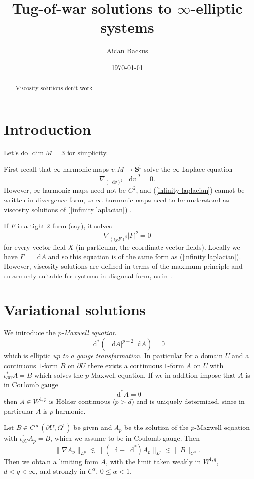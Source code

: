 \documentclass[reqno,11pt]{amsart}
\title{Tug-of-war solutions to $\infty$-elliptic systems}
\author{Aidan Backus}
\date{\today}
\newcommand{\Sph}{\mathbf S}
\newcommand*\dif{\mathop{}\!\mathrm{d}}
\newcommand{\dfn}[1]{\emph{#1}\index{#1}}
\theoremstyle{definition}
\numberwithin{equation}{section}
\begin{document}
\begin{abstract}
Viscosity solutions don't work
\end{abstract}

\maketitle

\section{Introduction}
Let's do $\dim M = 3$ for simplicity.

First recall that $\infty$-harmonic maps $v: M \to \Sph^1$ solve the $\infty$-Laplace equation 
\begin{equation}\label{infinity laplacian}
\nabla_{(\dif v)^\sharp} |\dif v|^2 = 0.
\end{equation}
However, $\infty$-harmonic maps need not be $C^2$, and (\ref{infinity laplacian}) cannot be written in divergence form, so $\infty$-harmonic maps need to be understood as viscosity solutions of (\ref{infinity laplacian}) \cite{Crandall2008}.

If $F$ is a tight $2$-form (say), it solves 
$$\nabla_{(\iota_X F)^\sharp} |F|^2 = 0$$
for every vector field $X$ (in particular, the coordinate vector fields).
Locally we have $F = \dif A$ and so this equation is of the same form as (\ref{infinity laplacian}).
However, viscosity solutions are defined in terms of the maximum principle and so are only suitable for systems in diagonal form, as in \cite{Ishii92}.

\section{Variational solutions}
We introduce the \dfn{$p$-Maxwell equation}
$$\dif^*(|\dif A|^{p - 2} \dif A) = 0$$
which is elliptic \emph{up to a gauge transformation}. 
In particular for a domain $U$ and a continuous $1$-form $B$ on $\partial U$ there exists a continuous $1$-form $A$ on $U$ with $\iota_{\partial U}^* A = B$ which solves the $p$-Maxwell equation.
If we in addition impose that $A$ is in Coulomb gauge 
$$\dif^* A = 0$$
then $A \in W^{1, p}$ is H\"older continuous ($p > d$) and is uniquely determined, since in particular $A$ is $p$-harmonic.

Let $B \in C^\infty(\partial U, \Omega^1)$ be given and $A_p$ be the solution of the $p$-Maxwell equation with $\iota_{\partial U}^* A_p = B$, which we assume to be in Coulomb gauge.
Then 
$$\|\nabla A_p\|_{L^p} \lesssim \|(\dif + \dif^*) A_p\|_{L^p} \lesssim \|B\|_{C^0}.$$
Then we obtain a limiting form $A$, with the limit taken weakly in $W^{1, q}$, $d < q < \infty$, and strongly in $C^\alpha$, $0 \leq \alpha < 1$.
\end{document}
